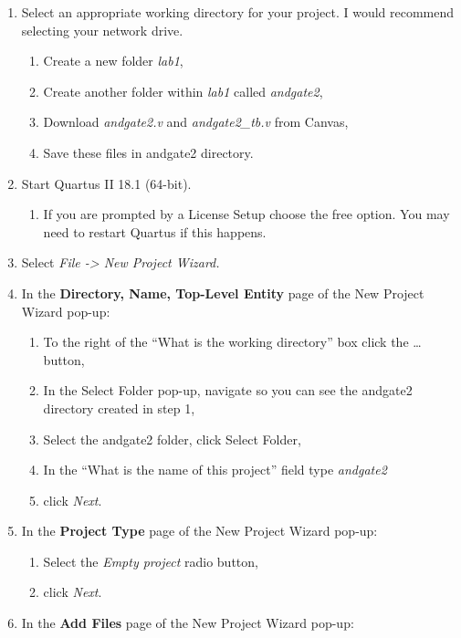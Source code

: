 \documentclass[
]{article}
\begin{document}
\begin{enumerate}
\def\labelenumi{\arabic{enumi}.}
\item
  Select an appropriate working directory for your project. I would
  recommend selecting your network drive.

  \begin{enumerate}
  \def\labelenumii{\alph{enumii}.}
  \item
    Create a new folder \emph{lab1},
  \item
    Create another folder within \emph{lab1} called \emph{andgate2},
  \item
    Download \emph{andgate2.v} and \emph{andgate2\_tb.v} from Canvas,
  \item
    Save these files in andgate2 directory.
  \end{enumerate}
\item
  Start Quartus II 18.1 (64-bit).

  \begin{enumerate}
  \def\labelenumii{\alph{enumii}.}
  \item
    If you are prompted by a License Setup choose the free option. You
    may need to restart Quartus if this happens.
  \end{enumerate}
\item
  Select \emph{File -\textgreater{} New Project Wizard.}
\item
  In the \textbf{Directory, Name, Top-Level Entity} page of the New
  Project Wizard pop-up:

  \begin{enumerate}
  \def\labelenumii{\alph{enumii}.}
  \item
    To the right of the ``What is the working directory'' box click the
    \ldots{} button,
  \item
    In the Select Folder pop-up, navigate so you can see the andgate2
    directory created in step 1,
  \item
    Select the andgate2 folder, click Select Folder,
  \item
    In the ``What is the name of this project'' field type
    \emph{andgate2}
  \item
    click \emph{Next}.
  \end{enumerate}
\item
  In the \textbf{Project Type} page of the New Project Wizard pop-up:

  \begin{enumerate}
  \def\labelenumii{\alph{enumii}.}
  \item
    Select the \emph{Empty project} radio button,
  \item
    click \emph{Next}.
  \end{enumerate}
\item
  In the \textbf{Add Files} page of the New Project Wizard pop-up:


\end{enumerate}
\end{document}
